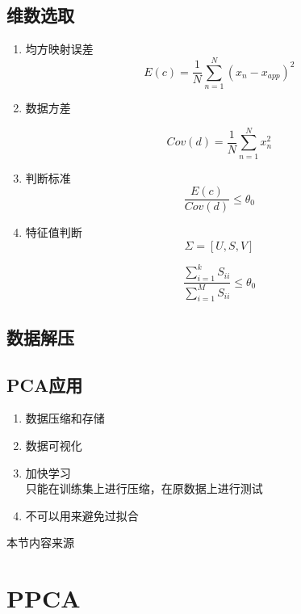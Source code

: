 \subsection{维数选取}

\begin{enumerate}
\item 均方映射误差
\begin{equation}
 E(c) = \frac{1}{N}\sum_{n=1}^N(x_n - x_{app})^2
\end{equation}
\item 数据方差

\begin{equation}
 Cov(d) = \frac{1}{N}\sum_{n=1}^Nx_n^2
\end{equation}

\item 判断标准
\begin{equation}
\frac{E(c)}{Cov(d)} \leq \theta_0
\end{equation}

\item 特征值判断
\begin{equation}
\Sigma = [U, S, V]
\end{equation}

\begin{equation}
\frac{\sum_{i = 1}^k S_{ii}}{\sum_{i = 1}^M S_{ii}} \leq \theta_0
\end{equation}
\end{enumerate}

\subsection{数据解压}

\subsection{PCA应用}
\begin{enumerate}
\item 数据压缩和存储
\item 数据可视化
\item 加快学习\\
只能在训练集上进行压缩，在原数据上进行测试
\item 不可以用来避免过拟合
\end{enumerate}
本节内容来源\cite{andrew2013courseramachinelearning}
\section{PPCA}
